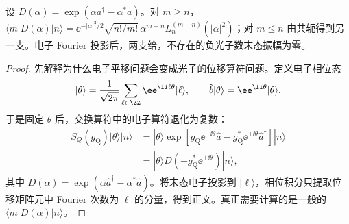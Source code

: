 \begin{lemma}
设 $D(\alpha)=\exp(\alpha a^\dagger-\alpha^*a)$。对 $m\ge n$，$\langle m|D(\alpha)|n\rangle=\ee^{-|\alpha|^2/2}\sqrt{n!/m!}\,\alpha^{m-n}L_n^{(m-n)}(|\alpha|^2)$；对 $m\le n$ 由共轭得到另一支。电子 Fourier 投影后，两支给，不存在的负光子数末态振幅为零。
\end{lemma}
\begin{proof}
先解释为什么电子平移问题会变成光子的位移算符问题。定义电子相位态
\begin{equation*}
 |\theta\rangle=\frac{1}{\sqrt{2\pi}}
 \sum_{\ell\in\ZZ}\ee^{\ii\ell\theta}|\ell\rangle,
 \qquad
 \hat b|\theta\rangle=\ee^{\ii\theta}|\theta\rangle .
\end{equation*}
于是固定 $\theta$ 后，交换算符中的电子算符退化为复数：
\begin{align*}
 S_Q(g_{\mathrm Q})|\theta\rangle|n\rangle
 &=|\theta\rangle
 \exp\!\left[
 g_{\mathrm Q} \ee^{-\ii\theta}\hat a
 -g_{\mathrm Q}^*\ee^{+\ii\theta}\hat a^\dagger
 \right]|n\rangle\\
 &=|\theta\rangle
 D\!\left(-g_{\mathrm Q}^*\ee^{+\ii\theta}\right)|n\rangle ,
\end{align*}
其中 $D(\alpha)=\exp(\alpha\hat a^\dagger-\alpha^*\hat a)$。将末态电子投影到 $|\ell\rangle$，相位积分只提取位移矩阵元中 Fourier 次数为 $\ell$ 的分量，得到正文。真正需要计算的是一般的 $\langle m|D(\alpha)|n\rangle$。


\end{proof}
